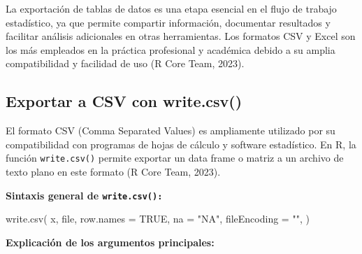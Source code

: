 \documentclass[
  spanish,
  a4paper,
  DIV=11,
  numbers=noendperiod,
  onepage,
  openany]{scrreprt}
\newenvironment{Shaded}{\begin{snugshade}}{\end{snugshade}}
\newcommand{\AttributeTok}[1]{\textcolor[rgb]{0.40,0.45,0.13}{#1}}
\newcommand{\ConstantTok}[1]{\textcolor[rgb]{0.56,0.35,0.01}{#1}}
\newcommand{\FunctionTok}[1]{\textcolor[rgb]{0.28,0.35,0.67}{#1}}
\newcommand{\NormalTok}[1]{\textcolor[rgb]{0.00,0.23,0.31}{#1}}
\newcommand{\StringTok}[1]{\textcolor[rgb]{0.13,0.47,0.30}{#1}}
\begin{document}
La exportación de tablas de datos es una etapa esencial en el flujo de
trabajo estadístico, ya que permite compartir información, documentar
resultados y facilitar análisis adicionales en otras herramientas. Los
formatos CSV y Excel son los más empleados en la práctica profesional y
académica debido a su amplia compatibilidad y facilidad de uso (R Core
Team, 2023).

\subsection{Exportar a CSV con
write.csv()}\label{exportar-a-csv-con-write.csv}

El formato CSV (Comma Separated Values) es ampliamente utilizado por su
compatibilidad con programas de hojas de cálculo y software estadístico.
En R, la función \texttt{write.csv()} permite exportar un data frame o
matriz a un archivo de texto plano en este formato (R Core Team, 2023).

\textbf{Sintaxis general de \texttt{write.csv():}}

\begin{Shaded}
\begin{Highlighting}[]
\FunctionTok{write.csv}\NormalTok{(}
\NormalTok{  x,           }
\NormalTok{  file,        }
  \AttributeTok{row.names =} \ConstantTok{TRUE}\NormalTok{,   }
  \AttributeTok{na =} \StringTok{"NA"}\NormalTok{,          }
  \AttributeTok{fileEncoding =} \StringTok{""}\NormalTok{,  }
\NormalTok{)}
\end{Highlighting}
\end{Shaded}

\textbf{Explicación de los argumentos principales:}
\end{document}
